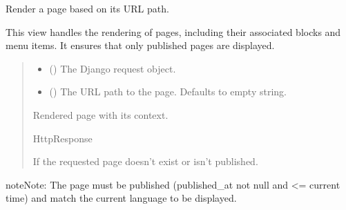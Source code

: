 \documentclass[letterpaper,10pt,english]{sphinxmanual}
\begin{document}
\begin{fulllineitems}
\label{\detokenize{pages_app.views:pages_app.views.page.render_page}}
\pysigstartsignatures
\pysiglinewithargsret
{}
{\sphinxparamcomma {}}
{}
\pysigstopsignatures
\sphinxAtStartPar
Render a page based on its URL path.

\sphinxAtStartPar
This view handles the rendering of pages, including their associated blocks
and menu items. It ensures that only published pages are displayed.
\begin{quote}\begin{description}
\begin{itemize}
\item {} 
\sphinxAtStartPar
{} () \textendash{} The Django request object.

\item {} 
\sphinxAtStartPar
{} (\sphinxstyleliteralemphasis{\sphinxupquote{, }}) \textendash{} The URL path to the page. Defaults to empty string.

\end{itemize}

\sphinxAtStartPar
Rendered page with its context.

\sphinxAtStartPar
HttpResponse

\sphinxAtStartPar
{} \textendash{} If the requested page doesn’t exist or isn’t published.

\end{description}\end{quote}

\begin{sphinxadmonition}{note}{Note:}
\sphinxAtStartPar
The page must be published (published\_at not null and \textless{}= current time)
and match the current language to be displayed.
\end{sphinxadmonition}

\end{fulllineitems}
\end{document}
